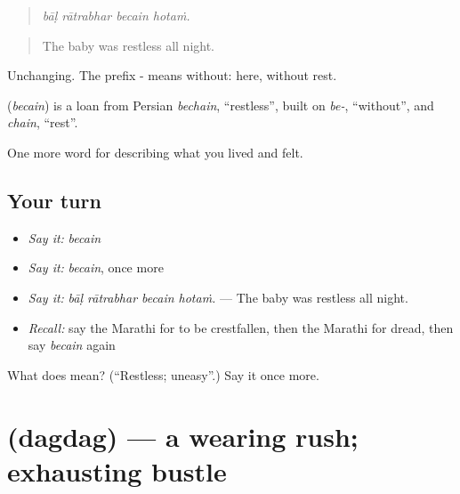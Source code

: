\begin{quote}
\emph{bāḷ rātrabhar becain hotaṁ.}
\end{quote}

\begin{quote}
The baby was restless all night.
\end{quote}

Unchanging. The prefix - means without: here, without rest.

\begin{cousinweb}
\textbf{} (\emph{becain}) is a loan from Persian \emph{bechain}, \textquotedblleft{}restless\textquotedblright{}, built on \emph{be-}, \textquotedblleft{}without\textquotedblright{}, and \emph{chain}, \textquotedblleft{}rest\textquotedblright{}.
\end{cousinweb}

\begin{grammarlens}[title={What you've built}]
One more word for describing what you lived and felt.
\end{grammarlens}

\subsection*{Your turn}
\begin{itemize}
\raggedright
  \item \emph{Say it:} \emph{becain}
  \item \emph{Say it:} \emph{becain}, once more
  \item \emph{Say it:} \emph{bāḷ rātrabhar becain hotaṁ.} — The baby was restless all night.
  \item \emph{Recall:} say the Marathi for to be crestfallen, then the Marathi for dread, then say \emph{becain} again
\end{itemize}

\begin{tcolorbox}[breakable,colback=teal!4,colframe=teal!35!black,title={Before you move on}]
What does  mean? (\textquotedblleft{}Restless; uneasy\textquotedblright{}.) Say it once more.
\end{tcolorbox}
\section[\texorpdfstring{\mr{दगदग} (dagdag)}{दगदग (dagdag)}]{ (dagdag) — a wearing rush; exhausting bustle}

\label{lesson:MR-C455-dagdag}



